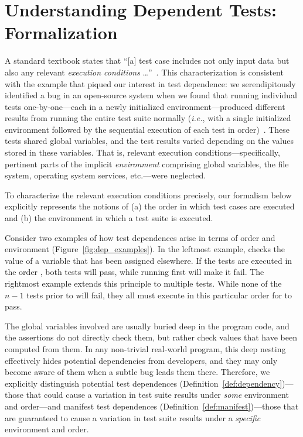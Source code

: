 
\section{Understanding Dependent Tests: Formalization}
\label{sec:formalism}

A standard textbook 
states that ``[a] test case includes not only input data but
also any relevant \emph{execution conditions}
\dots''~\cite[p.~152, emphasis added]{pezze-young:2007}.   
This characterization is
consistent with the example that 
 piqued our interest in test dependence: we seren\-dip\-itously identified a bug in an open-source
system when we found that running individual tests one-by-one---each
in a newly initialized environment---produced different
results from running the entire test suite normally (\emph{i.e.}, with a single initialized environment followed by
the sequential execution of each test in order)~\cite{DBLP:conf/sigsoft/MusluSW11}.  These tests
shared global variables, and the test results varied depending on the
values stored in these variables.  That is, relevant execution conditions---specifically, pertinent parts
of the implicit \emph{environment} comprising global variables, the file system, operating system services, etc.---were neglected.

To characterize the relevant execution conditions precisely, 
our formalism below explicitly represents the notions of
(a) the order in which test cases are executed and (b) the environment in which a test suite is executed.  

Consider two examples 
of how test dependences arise in terms of order and environment (Figure~\ref{fig:dep_examples}).
In the leftmost example,  checks
the value of a variable that has been assigned elsewhere. If the tests
are executed in the order , both tests will pass,
while running  first will make it fail.    The rightmost  example extends this
principle to multiple tests. While none of the $n-1$ tests prior to
 will fail, they all must execute in this particular order
for  to pass. 

The global variables involved are usually buried deep in
the program code, and the assertions do not directly check them,
but rather check values that have been computed from
them. In any non-trivial real-world program, this
deep nesting effectively hides potential dependencies from developers,
and they may only become aware of them when a subtle bug leads them
there.  Therefore, we explicitly
distinguish potential test dependences (Definition~\ref{def:dependency})---those that could cause a variation in test suite results 
under \emph{some} environment and order---and manifest test
dependences (Definition~\ref{def:manifest})---those that are guaranteed to cause a
variation in test suite results under a \emph{specific} environment and order.  

